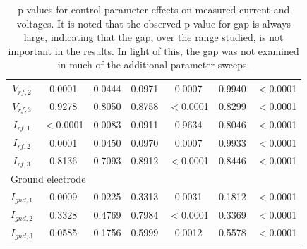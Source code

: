 \documentclass[12pt]{iopart}
\begin{document}
\begin{table}[]
\begin{tabular}{|c|c|c|c|c|c|c|}
        $V_{rf,2}$ & 0.0001 & 0.0444 & 0.0971 & 0.0007 & 0.9940 & $<$0.0001\\
        $V_{rf,3}$ & 0.9278 & 0.8050 & 0.8758 & $<$0.0001 & 0.8299 & $<$0.0001\\
        $I_{rf,1}$ &  $<$0.0001 & 0.0083 & 0.0911 & 0.9634 & 0.8046 & $<$0.0001\\
        $I_{rf,2}$ & 0.0001 & 0.0450 & 0.0970 & 0.0007 & 0.9933 & $<$0.0001\\
        $I_{rf,3}$ & 0.8136 & 0.7093 & 0.8912 & $<$0.0001 & 0.8446 & $<$0.0001\\
        \hline
        \multicolumn{7}{l}{Ground electrode} \\
        \hline
        $I_{gnd,1}$ & 0.0009 & 0.0225 & 0.3313 & 0.0031 & 0.1812 & $<$0.0001\\
        $I_{gnd,2}$ & 0.3328 & 0.4769 & 0.7984 & $<$0.0001 & 0.3369 & $<$0.0001\\
        $I_{gnd,3}$ & 0.0585 & 0.1756 & 0.5999 & 0.0012 & 0.5578 & $<$0.0001\\
        \hline
    \end{tabular}
    \caption{p-values for control parameter effects on measured current and voltages.  It is noted that the observed p-value for gap is always large, indicating that the gap, over the range studied, is not important in the results. In light of this, the gap was not examined in much of the additional parameter sweeps.}
    \label{tab:DOE_Results}
\end{table}
\end{document}

